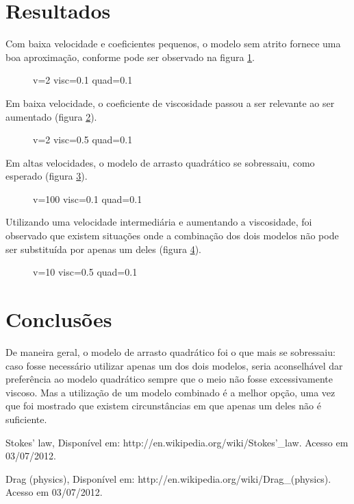 \section{Resultados}
Com baixa velocidade e coeficientes pequenos, o modelo sem atrito fornece uma boa aproximação, conforme pode ser observado na figura \ref{v2-visc0.1-quad0.1.eps}.

\begin{figure}[htbp!]
  \caption{v=2 visc=0.1 quad=0.1}
  \label{v2-visc0.1-quad0.1.eps}
  \centering
\end{figure}

Em baixa velocidade, o coeficiente de viscosidade passou a ser relevante ao ser aumentado (figura \ref{v2-visc0.5-quad0.1.eps}).

\begin{figure}[htbp!]
  \caption{v=2 visc=0.5 quad=0.1}
  \label{v2-visc0.5-quad0.1.eps}
  \centering
\end{figure}

Em altas velocidades, o modelo de arrasto quadrático se sobressaiu, como esperado (figura \ref{v100-visc0.1-quad0.1.eps}).

\begin{figure}[htbp!]
  \caption{v=100 visc=0.1 quad=0.1}
  \label{v100-visc0.1-quad0.1.eps}
  \centering
\end{figure}

Utilizando uma velocidade intermediária e aumentando a viscosidade, foi observado que existem situações onde a combinação dos dois modelos não pode ser substituída por apenas um deles (figura \ref{v10-visc0.5-quad0.1.eps}).

\begin{figure}[htbp!]
  \caption{v=10 visc=0.5 quad=0.1}
  \label{v10-visc0.5-quad0.1.eps}
  \centering
\end{figure}


\section{Conclusões}
De maneira geral, o modelo de arrasto quadrático foi o que mais se sobressaiu:
caso fosse necessário utilizar apenas um dos dois modelos, seria aconselhável dar preferência ao modelo quadrático sempre que o meio não fosse excessivamente viscoso.
Mas a utilização de um modelo combinado é a melhor opção, uma vez que foi mostrado que existem circunstâncias em que apenas um deles não é suficiente.

\begin{thebibliography}{99}

Stokes' law, 
Disponível em: http://en.wikipedia.org/wiki/Stokes'\_law.
Acesso em 03/07/2012.

Drag (physics), 
Disponível em: http://en.wikipedia.org/wiki/Drag\_(physics).
Acesso em 03/07/2012.

\end{thebibliography}



